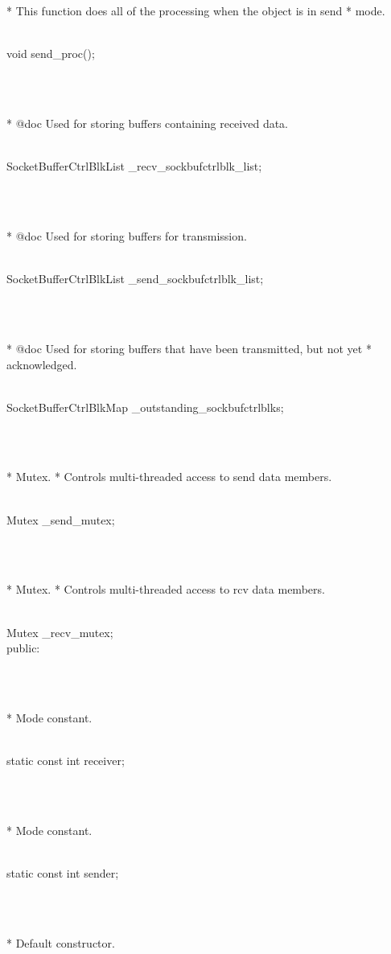 \documentclass{article}
\begin{document}
{	  * This function does all of the processing when the object is in send
	  * mode.
	  \strut\goodbreak
{}\strut\nopagebreak\\
         void send_proc();
\strut\\\strut\\* @doc Used for storing buffers containing received data. \strut\goodbreak
{}\strut\nopagebreak\\
         SocketBufferCtrlBlkList _recv_sockbufctrlblk_list;
\strut\\\strut\\* @doc Used for storing buffers for transmission. \strut\goodbreak
{}\strut\nopagebreak\\
         SocketBufferCtrlBlkList _send_sockbufctrlblk_list;
\strut\\\strut\\* @doc Used for storing buffers that have been transmitted, but not yet
	  * acknowledged.
	  \strut\goodbreak
{}\strut\nopagebreak\\
         SocketBufferCtrlBlkMap _outstanding_sockbufctrlblks;
\strut\\\strut\\* Mutex.
	  * Controls multi-threaded access to send data members.
	  \strut\goodbreak
{}\strut\nopagebreak\\
         Mutex _send_mutex;
\strut\\\strut\\* Mutex.
	  * Controls multi-threaded access to rcv data members.
	  \strut\goodbreak
{}\strut\nopagebreak\\
         Mutex _recv_mutex;
\\
 public:
\strut\\\strut\\* Mode constant. \strut\goodbreak
{}\strut\nopagebreak\\
         static const int receiver;
\strut\\\strut\\* Mode constant. \strut\goodbreak
{}\strut\nopagebreak\\
         static const int sender;
\strut\\\strut\\* Default constructor.
}
\end{document}
